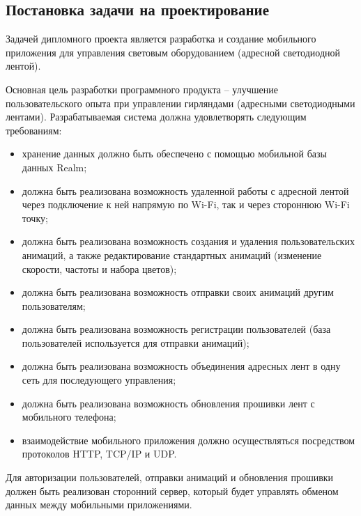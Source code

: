 \subsection{Постановка задачи на проектирование}
\label{sec:develop:task}

Задачей дипломного проекта является разработка и создание мобильного приложения для управления световым оборудованием (адресной светодиодной лентой). 

Основная цель разработки программного продукта – улучшение пользовательского опыта при управлении гирляндами (адресными светодиодными лентами).
Разрабатываемая система должна удовлетворять следующим требованиям:
\begin{itemize}
	\item хранение данных должно быть обеспечено с помощью мобильной базы данных Realm;
	\item должна быть реализована возможность удаленной работы с адресной лентой через подключение к ней напрямую по Wi-Fi, так и через стороннюю Wi-Fi точку;
	\item должна быть реализована возможность создания и удаления пользовательских анимаций, а также редактирование стандартных анимаций (изменение скорости, частоты и набора цветов);
	\item должна быть реализована возможность отправки своих анимаций другим пользователям;
	\item должна быть реализована возможность регистрации пользователей (база пользователей используется для отправки анимаций);
	\item должна быть реализована возможность объединения адресных лент в одну сеть для последующего управления;
	\item должна быть реализована возможность обновления прошивки лент с мобильного телефона;
	\item взаимодействие мобильного приложения должно осуществляться посредством протоколов HTTP, TCP/IP и UDP.
\end{itemize}

Для авторизации пользователей, отправки анимаций и обновления прошивки должен быть реализован сторонний сервер, который будет управлять обменом данных между мобильными приложениями.
